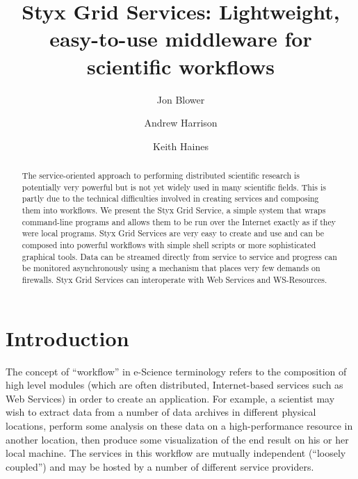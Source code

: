 \documentclass{llncs}
\begin{document}
%
\title{Styx Grid Services: Lightweight, easy-to-use middleware for scientific workflows}
%
%
\author{Jon Blower \and Andrew Harrison \and Keith Haines}
%
%
%

\maketitle              %

\begin{abstract}
The service-oriented approach to performing distributed scientific research is potentially very powerful but is not yet widely used in many scientific fields.  This is partly due to the technical difficulties involved in creating services and composing them into workflows.  We present the Styx Grid Service, a simple system that wraps command-line programs and allows them to be run over the Internet exactly as if they were local programs.  Styx Grid Services are very easy to create and use and can be composed into powerful workflows with simple shell scripts or more sophisticated graphical tools.  Data can be streamed directly from service to service and progress can be monitored asynchronously using a mechanism that places very few demands on firewalls.  Styx Grid Services can interoperate with Web Services and WS-Resources.
\end{abstract}
%
\section{Introduction}\label{sec:intro}

The concept of ``workflow'' in e-Science terminology refers to the composition of high level modules (which are often distributed, Internet-based services such as Web Services) in order to create an application.  For example, a scientist may wish to extract data from a number of data archives in different physical locations, perform some analysis on these data on a high-performance resource in another location, then produce some visualization of the end result on his or her local machine.  The services in this workflow are mutually independent (``loosely coupled'') and may be hosted by a number of different service providers.
\end{document}
